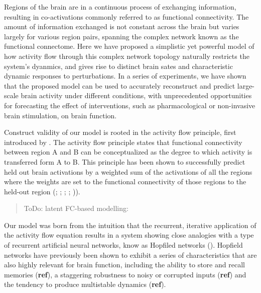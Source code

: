\documentclass{article}
\begin{document}
Regions of the brain are in a continuous process of exchanging information, resulting in co-activations commonly referred to as functional connectivity.
The amount of information exchanged is not constant across the brain but varies largely for various region pairs, spanning the complex network known as the functional connectome.
Here we have proposed a simplistic yet powerful model of how activity flow through this complex network topology naturally restricts the system's dyanmics, and gives rise to distinct brain sates and characteristic dynamic responses to perturbations.
In a series of experiments, we have shown that the proposed model can be used to accurately reconstruct and predict large-scale brain activity under different conditions, with unprecedented opportunities for forecasting the effect of interventions, such as pharmacological or non-invasive brain stimulation, on brain function.

Construct validity of our model is rooted in the activity flow principle, first introduced by \href{https://doi.org/10.1038/nn.4406}{}. The activity flow principle states that functional connectivity between region A and B can be conceptualized as the degree to which activity is transferred form A to B. This principle has been shown to successfully predict held out brain activations by a weighted sum of the activations of all the regions where the weights are set to the functional connectivity of those regions to the held-out region (\cite{Cole_2016}; \href{https://doi.org/10.1038/s41467-017-01000-w}{}; \href{https://doi.org/10.1371/journal.pbio.3001686}{}; \href{https://doi.org/10.1126/sciadv.abf2513}{}; \href{https://doi.org/10.1089/brain.2018.0586}{})).

\begin{quote}
ToDo: latent FC-based modelling: \href{https://doi.org/10.1162/netn\_a\_00234}{}
\end{quote}

Our model was born from the intuition that the recurrent, iterative application of the activity flow equation results in a system showing close analogies with a type of recurrent artificial neural networks, know as Hopfiled networks (\href{https://doi.org/10.1073/pnas.79.8.2554}{}).
Hopfield networks have previously been shown to exhibit a series of characteristics that are also highly relevant for brain function, including the ability to store and recall memories (\textbf{ref}), a staggering robustness to noisy or corrupted inputs (\textbf{ref}) and the tendency to produce multistable dynamics (\textbf{ref}).
\end{document}
